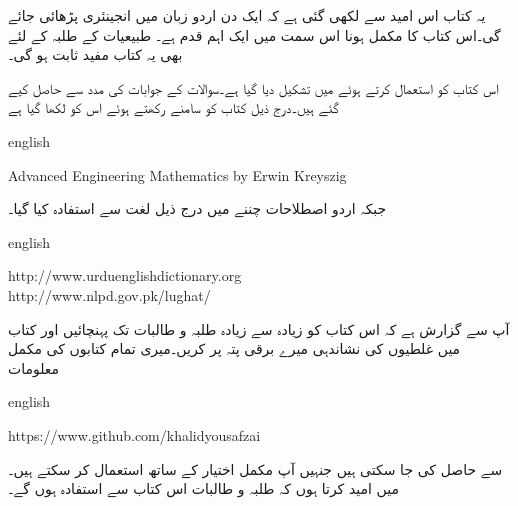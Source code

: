 یہ کتاب اس امید سے لکھی گئی ہے کہ ایک دن اردو زبان میں انجینئری پڑھائی جائے گی۔اس کتاب کا مکمل ہونا اس سمت میں ایک اہم قدم ہے۔ طبیعیات کے طلبہ کے لئے بھی یہ کتاب مفید ثابت ہو گی۔

اس کتاب کو  استعمال کرتے ہوئے  میں تشکیل دیا گیا ہے۔سوالات کے جوابات  کی مدد سے حاصل کیے گئے ہیں۔درج ذیل کتاب کو سامنے رکھتے ہوئے  اس کو لکھا گیا ہے

{
\begin{otherlanguage*}{english}
\begin{LTR}
Advanced Engineering Mathematics by Erwin Kreyszig
\end{LTR}
\end{otherlanguage*}
}

جبکہ اردو اصطلاحات چننے میں درج ذیل لغت سے استفادہ  کیا گیا۔

{
\begin{otherlanguage*}{english}
\begin{LTR}
http:/\!\!/www.urduenglishdictionary.org\\
http:/\!\!/www.nlpd.gov.pk/lughat/
\end{LTR}
\end{otherlanguage*}
}

آپ سے گزارش ہے کہ اس کتاب کو زیادہ سے زیادہ طلبہ و طالبات تک پہنچائیں اور کتاب میں غلطیوں کی نشاندہی میرے  برقی پتہ پر کریں۔میری تمام کتابوں کی مکمل  معلومات

{
\begin{otherlanguage*}{english}
\begin{LTR}
https:/\!\!/www.github.com/khalidyousafzai
\end{LTR}
\end{otherlanguage*}
}

سے حاصل کی جا سکتی ہیں جنہیں آپ مکمل اختیار کے ساتھ استعمال کر سکتے ہیں۔میں امید کرتا ہوں کہ طلبہ و طالبات اس کتاب سے استفادہ ہوں گے۔
\vspace{3mm}

{}


